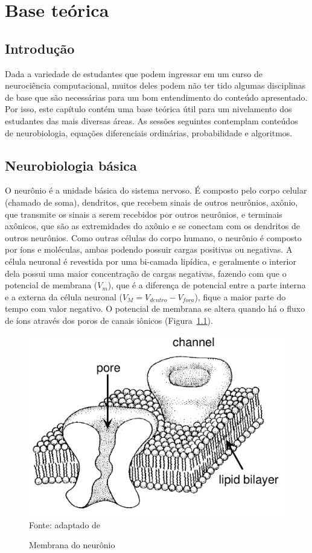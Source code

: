 \chapter{Base teórica}\label{cap:teoria}
\section{Introdução}\label{sec:teoria_intro}
Dada a variedade de estudantes que podem ingressar em um curso de neurociência computacional, muitos deles podem não ter tido algumas disciplinas de base que são necessárias para um bom entendimento do conteúdo apresentado. Por isso, este capítulo contém uma base teórica útil para um nivelamento dos estudantes das mais diversas áreas. As sessões seguintes contemplam conteúdos de neurobiologia, equações diferenciais ordinárias, probabilidade e algoritmos.

\section{Neurobiologia básica}\label{sec:fisiologia}
O neurônio é a unidade básica do sistema nervoso.
É composto pelo corpo celular (chamado de soma), dendritos, que recebem sinais de outros neurônios, axônio, que transmite os sinais a serem recebidos por outros neurônios, e terminais axônicos, que são as extremidades do axônio e se conectam com os dendritos de outros neurônios. Como outras células do corpo humano, o neurônio é composto por íons e moléculas, ambas podendo possuir cargas positivas ou negativas. A célula neuronal é revestida por uma bi-camada lipídica, e geralmente o interior dela possui uma maior concentração de cargas negativas, fazendo com que o potencial de membrana ($V_m$), que é a diferença de potencial entre a parte interna e a externa da célula neuronal ($V_M=V_{dentro}-V_{fora}$), fique a maior parte do tempo com valor negativo. O potencial de membrana se altera quando há o fluxo de íons através dos poros de canais iônicos (Figura~\ref{fig:membrananeuronio}).

\begin{figure}[tb]
	\centering
	\caption[Membrana do neurônio]{Membrana do neurônio}
	\includegraphics[width=0.55\linewidth]{figs/membrana_neuronio}
	\label{fig:membrananeuronio}
	\\
	Fonte: adaptado de \cite{hille_ionic_1992}
\end{figure}

